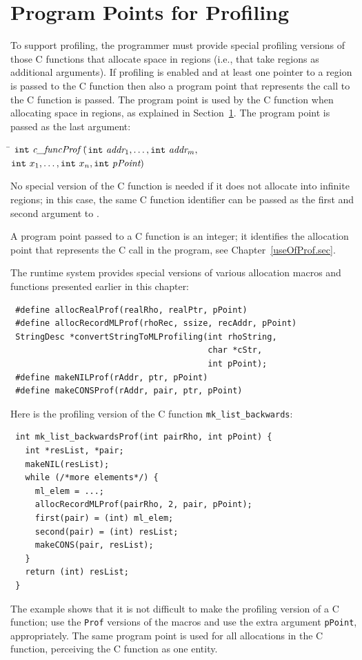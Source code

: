 \documentclass[12pt]{book}
\begin{document}
\section{Program Points for Profiling}
\label{prof.sec}
To support profiling, the programmer must provide special profiling
versions of those C functions that allocate space in regions (i.e.,
that take regions as additional arguments). If profiling is enabled
and at least one pointer to a region is passed to the C function then
also a program point that represents the call to the C function is
passed.  The program point is used by the C function when allocating
space in regions, as explained in Section~\ref{prof.sec}. The program
point is passed as the last argument:
\begin{tabbing}
\indent\=  $\texttt{int} \ \emph{c\_funcProf} \ ($\=$\texttt{int}\ \emph{addr}_1,
    \ldots, \texttt{int}\ \emph{addr}_m,$\\
  \>\>$ \texttt{int}\ x_1, \ldots,
    \texttt{int}\ x_n, \texttt{int}\ \emph{pPoint}) $
\end{tabbing}
\noindent
No special version of the C function is needed if it does not allocate
into infinite regions; in this case, the same C function identifier can be
passed as the first and second argument to .

A program point passed to a C function is an integer; it identifies the
allocation point that represents the C call in the program, see
Chapter~\ref{useOfProf.sec}.

The runtime system provides special versions of various allocation
macros and functions presented earlier in this chapter:
%
%
%
%
%
\begin{verbatim}
 #define allocRealProf(realRho, realPtr, pPoint)
 #define allocRecordMLProf(rhoRec, ssize, recAddr, pPoint)
 StringDesc *convertStringToMLProfiling(int rhoString, 
                                        char *cStr, 
                                        int pPoint);
 #define makeNILProf(rAddr, ptr, pPoint)
 #define makeCONSProf(rAddr, pair, ptr, pPoint)
\end{verbatim}

Here is the profiling version of the C function
\verb|mk_list_backwards|:
\begin{verbatim}
 int mk_list_backwardsProf(int pairRho, int pPoint) {
   int *resList, *pair;
   makeNIL(resList);  
   while (/*more elements*/) {
     ml_elem = ...;
     allocRecordMLProf(pairRho, 2, pair, pPoint);
     first(pair) = (int) ml_elem;
     second(pair) = (int) resList;
     makeCONS(pair, resList);
   }
   return (int) resList;
 }
\end{verbatim}
The example shows that it is not difficult to make the profiling
version of a C function; use the \texttt{Prof} versions of the
macros and use the extra argument \texttt{pPoint}, appropriately. The
same program point is used for all allocations in the C function,
perceiving the C function as one entity.
\end{document}
